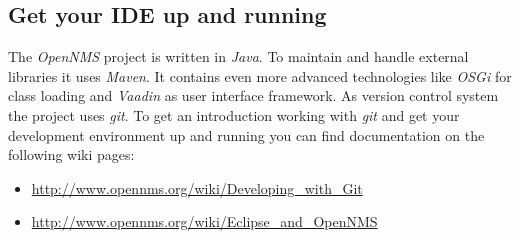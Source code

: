 \subsection*{Get your IDE up and running}
The \emph{OpenNMS} project is written in \emph{Java}. To maintain and handle external libraries it uses \emph{Maven}. It contains even more advanced technologies like \emph{OSGi} for class loading and \emph{Vaadin} as user interface framework. As version control system the project uses \emph{git}. To get an introduction working with \emph{git} and get your development environment up and running you can find documentation on the following wiki pages:
\begin{itemize}
  \item \url{http://www.opennms.org/wiki/Developing_with_Git}
  \item \url{http://www.opennms.org/wiki/Eclipse_and_OpenNMS}
\end{itemize}

